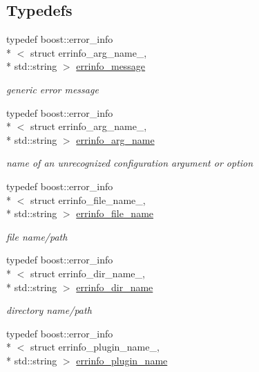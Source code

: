 \subsection*{Typedefs}
\begin{DoxyCompactItemize}
\item 
typedef boost\-::error\-\_\-info\\*
$<$ struct errinfo\-\_\-arg\-\_\-name\-\_\-, \\*
std\-::string $>$ \hyperlink{namespacepion_1_1error_a5ee8b972a03980d77e8abf0c12349449}{errinfo\-\_\-message}
\begin{DoxyCompactList}\small\item\em generic error message \end{DoxyCompactList}\item 
typedef boost\-::error\-\_\-info\\*
$<$ struct errinfo\-\_\-arg\-\_\-name\-\_\-, \\*
std\-::string $>$ \hyperlink{namespacepion_1_1error_a490aee146b33a07ff0cf1054379633cf}{errinfo\-\_\-arg\-\_\-name}
\begin{DoxyCompactList}\small\item\em name of an unrecognized configuration argument or option \end{DoxyCompactList}\item 
typedef boost\-::error\-\_\-info\\*
$<$ struct errinfo\-\_\-file\-\_\-name\-\_\-, \\*
std\-::string $>$ \hyperlink{namespacepion_1_1error_a5526ef1c3e6ab8db270a0d49a66a5782}{errinfo\-\_\-file\-\_\-name}
\begin{DoxyCompactList}\small\item\em file name/path \end{DoxyCompactList}\item 
typedef boost\-::error\-\_\-info\\*
$<$ struct errinfo\-\_\-dir\-\_\-name\-\_\-, \\*
std\-::string $>$ \hyperlink{namespacepion_1_1error_ac098c77a623d21817e85bc6ee8df5c09}{errinfo\-\_\-dir\-\_\-name}
\begin{DoxyCompactList}\small\item\em directory name/path \end{DoxyCompactList}\item 
typedef boost\-::error\-\_\-info\\*
$<$ struct errinfo\-\_\-plugin\-\_\-name\-\_\-, \\*
std\-::string $>$ \hyperlink{namespacepion_1_1error_a7327ab3a3df1bd5f5ca8fb259260da2f}{errinfo\-\_\-plugin\-\_\-name}

\end{DoxyCompactItemize}
